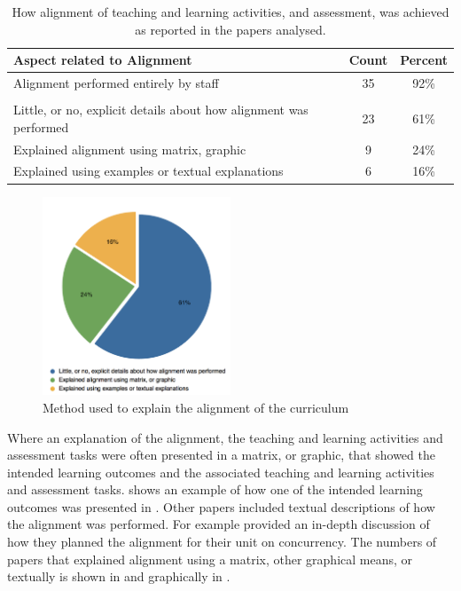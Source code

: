 \begin{table}[p]
	\centering
	\caption{How alignment of teaching and learning activities, and assessment, was achieved as reported in the papers analysed.}
	\label{tbl:alignment_details}
	\footnotesize
    \begin{tabular}{l|c|c}
     \textbf{Aspect related to Alignment} & \textbf{Count} & \textbf{Percent} \\ \hline
	Alignment performed entirely by staff	 & 35	& 92\% \\
	&& \\
	Little, or no, explicit details about how alignment was performed	 & 23	& 61\% \\
	Explained alignment using matrix, graphic & 	9	& 24\% \\
	Explained using examples or textual explanations & 	6	& 16\% \\
    \end{tabular}
\end{table}

\begin{figure}[p]
	\centering
	\includegraphics[width=0.5\textwidth]{AlignmentExplanation}
	\caption{Method used to explain the alignment of the curriculum}
	\label{fig:alignment_explain}
\end{figure}

Where an explanation of the alignment, the teaching and learning activities and assessment tasks were often presented in a matrix, or graphic, that showed the intended learning outcomes and the associated teaching and learning activities and assessment tasks.  shows an example of how one of the intended learning outcomes was presented in \citet{terrell2011using}. Other papers included textual descriptions of how the alignment was performed. For example \citet{Brabrand:2008} provided an in-depth discussion of how they planned the alignment for their unit on concurrency. The numbers of papers that explained alignment using a matrix, other graphical means, or textually is shown in  and graphically in .

